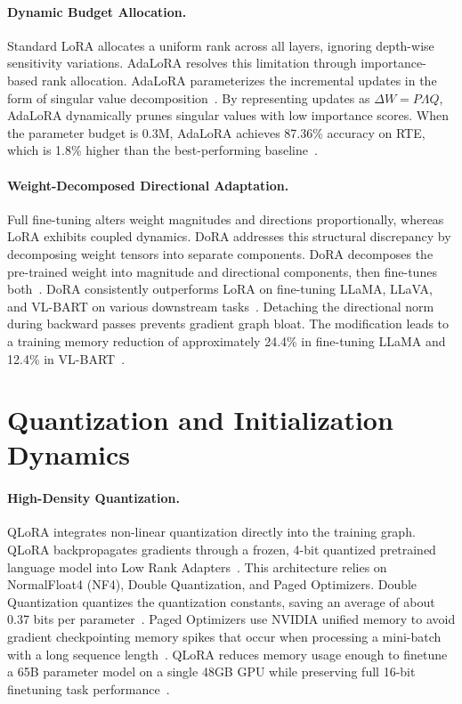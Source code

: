 \documentclass[11pt,a4paper]{article}
\begin{document}
\paragraph{Dynamic Budget Allocation.}
Standard LoRA allocates a uniform rank across all layers, ignoring depth-wise sensitivity variations. AdaLoRA resolves this limitation through importance-based rank allocation. AdaLoRA parameterizes the incremental updates in the form of singular value decomposition~\citep{zhang2023adalora}. By representing updates as $\Delta W = P \Lambda Q$, AdaLoRA dynamically prunes singular values with low importance scores. When the parameter budget is 0.3M, AdaLoRA achieves 87.36\% accuracy on RTE, which is 1.8\% higher than the best-performing baseline~\citep{zhang2023adalora}.

\paragraph{Weight-Decomposed Directional Adaptation.}
Full fine-tuning alters weight magnitudes and directions proportionally, whereas LoRA exhibits coupled dynamics. DoRA addresses this structural discrepancy by decomposing weight tensors into separate components. DoRA decomposes the pre-trained weight into magnitude and directional components, then fine-tunes both~\citep{liu2024dora}. DoRA consistently outperforms LoRA on fine-tuning LLaMA, LLaVA, and VL-BART on various downstream tasks~\citep{liu2024dora}. Detaching the directional norm during backward passes prevents gradient graph bloat. The modification leads to a training memory reduction of approximately 24.4\% in fine-tuning LLaMA and 12.4\% in VL-BART~\citep{liu2024dora}.

\section{Quantization and Initialization Dynamics}

\paragraph{High-Density Quantization.}
QLoRA integrates non-linear quantization directly into the training graph. QLoRA backpropagates gradients through a frozen, 4-bit quantized pretrained language model into Low Rank Adapters~\citep{dettmers2023qlora}. This architecture relies on NormalFloat4 (NF4), Double Quantization, and Paged Optimizers. Double Quantization quantizes the quantization constants, saving an average of about 0.37 bits per parameter~\citep{dettmers2023qlora}. Paged Optimizers use NVIDIA unified memory to avoid gradient checkpointing memory spikes that occur when processing a mini-batch with a long sequence length~\citep{dettmers2023qlora}. QLoRA reduces memory usage enough to finetune a 65B parameter model on a single 48GB GPU while preserving full 16-bit finetuning task performance~\citep{dettmers2023qlora}.
\end{document}
